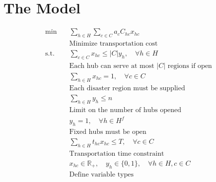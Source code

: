 \documentclass{article}
\begin{document}
\section{The Model}
\begin{align*}
    \min \quad & \sum_{h \in H} \sum_{c \in C} a_c C_{hc} x_{hc} \\
    & \text{Minimize transportation cost} \\
    \text{s.t.} \quad & \sum_{c \in C} x_{hc} \leq |C| y_h, \quad \forall h \in H \\
    & \text{Each hub can serve at most $|C|$ regions if open} \\
    & \sum_{h \in H} x_{hc} = 1, \quad \forall c \in C \\
    & \text{Each disaster region must be supplied} \\
    & \sum_{h \in H} y_h \leq n \\
    & \text{Limit on the number of hubs opened} \\
    & y_h = 1, \quad \forall h \in H^f \\
    & \text{Fixed hubs must be open} \\
    & \sum_{h \in H} t_{hc} x_{hc} \leq T, \quad \forall c \in C \\
    & \text{Transportation time constraint} \\
    & x_{hc} \in \mathbb{R}_+, \quad y_h \in \{0,1\}, \quad \forall h \in H, c \in C \\
    & \text{Define variable types}
\end{align*}
\end{document}
